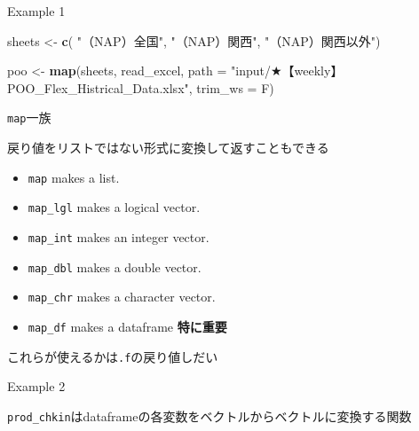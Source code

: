 \documentclass[ignorenonframetext,]{beamer}
\newenvironment{Shaded}{\begin{snugshade}}{\end{snugshade}}
\newcommand{\KeywordTok}[1]{\textcolor[rgb]{0.13,0.29,0.53}{\textbf{#1}}}
\newcommand{\DataTypeTok}[1]{\textcolor[rgb]{0.13,0.29,0.53}{#1}}
\newcommand{\StringTok}[1]{\textcolor[rgb]{0.31,0.60,0.02}{#1}}
\newcommand{\CommentTok}[1]{\textcolor[rgb]{0.56,0.35,0.01}{\textit{#1}}}
\newcommand{\OperatorTok}[1]{\textcolor[rgb]{0.81,0.36,0.00}{\textbf{#1}}}
\newcommand{\NormalTok}[1]{#1}
\providecommand{\tightlist}{%
  \setlength{\itemsep}{0pt}\setlength{\parskip}{0pt}}
\begin{document}
\begin{frame}[fragile]{Example 1}

\begin{Shaded}
\begin{Highlighting}[]
\NormalTok{sheets <-}\StringTok{ }\KeywordTok{c}\NormalTok{( }\StringTok{"（NAP）全国"}\NormalTok{,}
        \StringTok{"（NAP）関西"}\NormalTok{,}
        \StringTok{"（NAP）関西以外"}\NormalTok{)}

\NormalTok{poo <-}\StringTok{ }\KeywordTok{map}\NormalTok{(sheets,}
\NormalTok{       read_excel,}
       \DataTypeTok{path =} \StringTok{"input/★【weekly】POO_Flex_Histrical_Data.xlsx"}\NormalTok{,}
       \DataTypeTok{trim_ws =}\NormalTok{ F)}
\end{Highlighting}
\end{Shaded}

\end{frame}

\begin{frame}[fragile]{\texttt{map}一族}

戻り値をリストではない形式に変換して返すこともできる

\begin{itemize}
\tightlist
\item
  \texttt{map} makes a list.
\item
  \texttt{map\_lgl} makes a logical vector.
\item
  \texttt{map\_int} makes an integer vector.
\item
  \texttt{map\_dbl} makes a double vector.
\item
  \texttt{map\_chr} makes a character vector.
\item
  \texttt{map\_df} makes a dataframe \textbf{特に重要}
\end{itemize}

これらが使えるかは\texttt{.f}の戻り値しだい

\end{frame}

\begin{frame}[fragile]{Example 2}

\begin{Shaded}
\end{Shaded}

\texttt{prod\_chkin}はdataframeの各変数をベクトルからベクトルに変換する関数

\end{frame}
\end{document}
